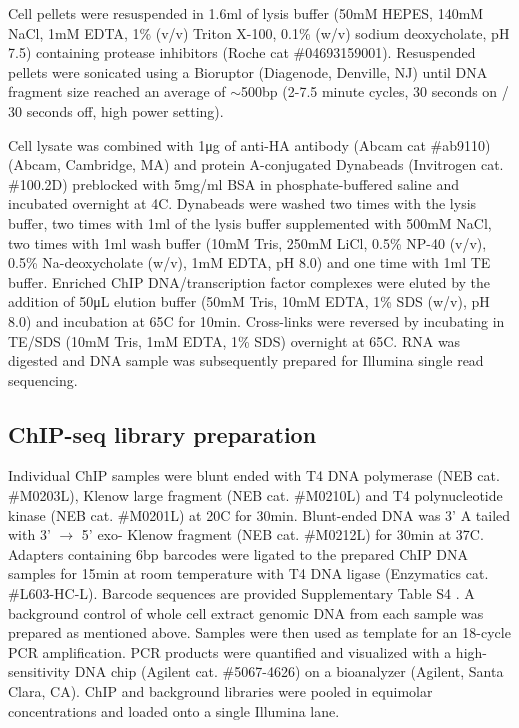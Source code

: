 Cell pellets were resuspended in 1.6ml of lysis buffer (50mM HEPES, 140mM NaCl, 1mM EDTA, 1\% (v/v) Triton X-100, 0.1\% (w/v) sodium deoxycholate, pH 7.5) containing protease inhibitors (Roche cat \#04693159001). Resuspended pellets were sonicated using a Bioruptor (Diagenode, Denville, NJ) until DNA fragment size reached an average of $\sim$500bp (2-7.5 minute cycles, 30 seconds on / 30 seconds off, high power setting).

Cell lysate was combined with 1\si{\micro\gram} of anti-HA antibody (Abcam cat \#ab9110) (Abcam, Cambridge, MA) and protein A-conjugated Dynabeads (Invitrogen cat. \#100.2D) preblocked with 5mg/ml BSA in phosphate-buffered saline and incubated overnight at 4\degree C. Dynabeads were washed two times with the lysis buffer, two times with 1ml of the lysis buffer supplemented with 500mM NaCl, two times with 1ml wash buffer (10mM Tris, 250mM LiCl, 0.5\% NP-40 (v/v), 0.5\% Na-deoxycholate (w/v), 1mM EDTA, pH 8.0) and one time with 1ml TE buffer. Enriched ChIP DNA/transcription factor complexes were eluted by the addition of 50\si{\micro\liter} elution buffer (50mM Tris, 10mM EDTA, 1\% SDS (w/v), pH 8.0) and incubation at 65\degree C for 10min. Cross-links were reversed by incubating in TE/SDS (10mM Tris, 1mM EDTA, 1\% SDS) overnight at 65\degree C. RNA was digested and DNA sample was subsequently prepared for Illumina single read sequencing.

\subsection{ChIP-seq library preparation}

Individual ChIP samples were blunt ended with T4 DNA polymerase (NEB cat. \#M0203L), Klenow large fragment (NEB cat. \#M0210L) and T4 polynucleotide kinase (NEB cat. \#M0201L) at 20\degree C for 30min. Blunt-ended DNA was 3' A tailed with 3' $\rightarrow$ 5' exo- Klenow fragment (NEB cat. \#M0212L) for 30min at 37\degree C. Adapters containing 6bp barcodes were ligated to the prepared ChIP DNA samples for 15min at room temperature with T4 DNA ligase (Enzymatics cat. \#L603-HC-L). Barcode sequences are provided Supplementary Table S4 . A background control of whole cell extract genomic DNA from each sample was prepared as mentioned above. Samples were then used as template for an 18-cycle PCR amplification. PCR products were quantified and visualized with a high-sensitivity DNA chip (Agilent cat. \#5067-4626) on a bioanalyzer (Agilent, Santa Clara, CA). ChIP and background libraries were pooled in equimolar concentrations and loaded onto a single Illumina lane.


